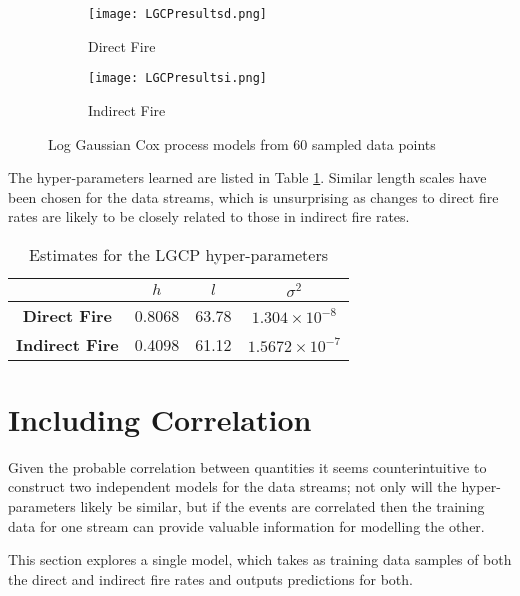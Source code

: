 \documentclass[a4paper,11pt]{report}
\begin{document}
\par
\begin{figure}
\centering
\begin{subfigure}{.5\textwidth}
	\centering
	\texttt{[image: LGCPresultsd.png]}
  	\caption{Direct Fire}
\end{subfigure}%
\begin{subfigure}{.5\textwidth}
  	\centering
  	\texttt{[image: LGCPresultsi.png]}
  	\caption{Indirect Fire}
\end{subfigure}
\caption{Log Gaussian Cox process models from 60 sampled data points}
\label{fig:LGCPresults}
\end{figure}

The hyper-parameters learned are listed in Table \ref{LGCPhyperparameters}. Similar length scales have been chosen for the data streams, which is unsurprising as changes to direct fire rates are likely to be closely related to those in indirect fire rates. 


\singlespacing
\begin{table}[]
\centering
\caption{Estimates for the LGCP hyper-parameters}
\label{LGCPhyperparameters}
\begin{tabular}{c|c|c|c|}
\cline{2-4}
\textbf{}                                    & \(h\) & \(l\) & \(\sigma^2\) \\ \hline
\multicolumn{1}{|c|}{\textbf{Direct Fire}}   & 0.8068          & 63.78          & \(1.304\times 10^{-8}\)              \\ \hline
\multicolumn{1}{|c|}{\textbf{Indirect Fire}} & 0.4098          & 61.12          & \(1.5672\times 10^{-7}\)              \\ \hline
\end{tabular}
\end{table}
\doublespacing

\section{Including Correlation}

Given the probable correlation between quantities it seems counterintuitive to construct two independent models for the data streams; not only will the hyper-parameters likely be similar, but if the events are correlated then the training data for one stream can provide valuable information for modelling the other.\par

This section explores a single model, which takes as training data samples of both the direct and indirect fire rates and outputs predictions for both.
\end{document}
